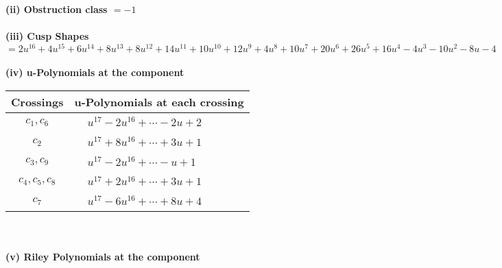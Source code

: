 \documentclass[1p]{elsarticle_modified}
\theoremstyle{definition}
\begin{document}
\flushleft \textbf{(ii) Obstruction class $= -1$}\\~\\
\flushleft \textbf{(iii) Cusp Shapes $= 2 u^{16}+4 u^{15}+6 u^{14}+8 u^{13}+8 u^{12}+14 u^{11}+10 u^{10}+12 u^9+4 u^8+10 u^7+20 u^6+26 u^5+16 u^4-4 u^3-10 u^2-8 u-4$}\\~\\
\newpage\renewcommand{\arraystretch}{1}
\flushleft \textbf{(iv) u-Polynomials at the component}\newline \\
\begin{tabular}{m{50pt}|m{274pt}}
Crossings & \hspace{64pt}u-Polynomials at each crossing \\
\hline $$\begin{aligned}c_{1},c_{6}\end{aligned}$$&$\begin{aligned}
&u^{17}-2 u^{16}+\cdots-2 u+2
\end{aligned}$\\
\hline $$\begin{aligned}c_{2}\end{aligned}$$&$\begin{aligned}
&u^{17}+8 u^{16}+\cdots+3 u+1
\end{aligned}$\\
\hline $$\begin{aligned}c_{3},c_{9}\end{aligned}$$&$\begin{aligned}
&u^{17}-2 u^{16}+\cdots- u+1
\end{aligned}$\\
\hline $$\begin{aligned}c_{4},c_{5},c_{8}\end{aligned}$$&$\begin{aligned}
&u^{17}+2 u^{16}+\cdots+3 u+1
\end{aligned}$\\
\hline $$\begin{aligned}c_{7}\end{aligned}$$&$\begin{aligned}
&u^{17}-6 u^{16}+\cdots+8 u+4
\end{aligned}$\\
\hline
\end{tabular}\\~\\
\newpage\renewcommand{\arraystretch}{1}
\flushleft \textbf{(v) Riley Polynomials at the component}\newline \\
\end{document}
